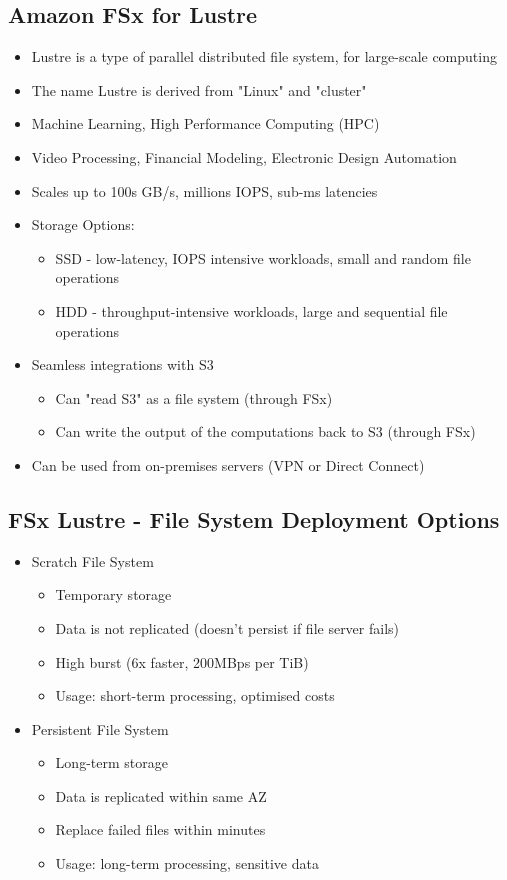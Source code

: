 \subsection{Amazon FSx for Lustre}
\begin{itemize}
    \item Lustre is a type of parallel distributed file system, for large-scale computing
    \item The name Lustre is derived from "Linux" and "cluster"
    \item Machine Learning, High Performance Computing (HPC)
    \item Video Processing, Financial Modeling, Electronic Design Automation
    \item Scales up to 100s GB/s, millions IOPS, sub-ms latencies
    \item Storage Options:
    \begin{itemize}
        \item SSD - low-latency, IOPS intensive workloads, small and random file operations
        \item HDD - throughput-intensive workloads, large and sequential file operations
    \end{itemize}
    \item Seamless integrations with S3
    \begin{itemize}
        \item Can "read S3" as a file system (through FSx)
        \item Can write the output of the computations back to S3 (through FSx)
    \end{itemize}
    \item Can be used from on-premises servers (VPN or Direct Connect)
\end{itemize}

\subsection{FSx Lustre - File System Deployment Options}
\begin{itemize}
    \item Scratch File System
    \begin{itemize}
        \item Temporary storage
        \item Data is not replicated (doesn't persist if file server fails)
        \item High burst (6x faster, 200MBps per TiB)
        \item Usage: short-term processing, optimised costs
    \end{itemize}
    \item Persistent File System
    \begin{itemize}
        \item Long-term storage
        \item Data is replicated within same AZ
        \item Replace failed files within minutes
        \item Usage: long-term processing, sensitive data
    \end{itemize}
\end{itemize}

